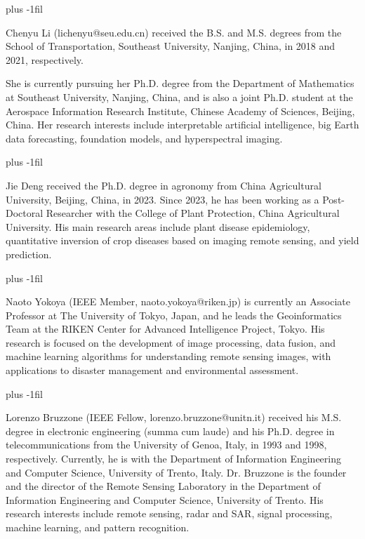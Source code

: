 \documentclass[journal]{IEEEtran}
\begin{document}
\baselineskip plus -1fil

\begin{IEEEbiographynophoto}
    {Chenyu Li} (lichenyu@seu.edu.cn) received the B.S. and M.S. degrees from the School of Transportation, Southeast University, Nanjing, China, in 2018 and 2021, respectively. 

    She is currently pursuing her Ph.D. degree from the Department of Mathematics at Southeast University, Nanjing, China, and is also a joint Ph.D. student at the Aerospace Information Research Institute, Chinese Academy of Sciences, Beijing, China. Her research interests include interpretable artificial intelligence, big Earth data forecasting, foundation models, and hyperspectral imaging.
\end{IEEEbiographynophoto}

\baselineskip plus -1fil

\begin{IEEEbiographynophoto}
    {Jie Deng} received the Ph.D. degree in agronomy from China Agricultural University, Beijing, China, in 2023. Since 2023, he has been working as a Post-Doctoral Researcher with the College of Plant Protection, China Agricultural University. His main research areas include plant disease epidemiology, quantitative inversion of crop diseases based on imaging remote sensing, and yield prediction.
\end{IEEEbiographynophoto}

\baselineskip plus -1fil

\begin{IEEEbiographynophoto}
    {Naoto Yokoya} (IEEE Member, naoto.yokoya@riken.jp) is currently an Associate Professor at The University of Tokyo, Japan, and he leads the Geoinformatics Team at the RIKEN Center for Advanced Intelligence Project, Tokyo. His research is focused on the development of image processing, data fusion, and machine learning algorithms for understanding remote sensing images, with applications to disaster management and environmental assessment.
\end{IEEEbiographynophoto}

\baselineskip plus -1fil

\begin{IEEEbiographynophoto}
    {Lorenzo Bruzzone} (IEEE Fellow, lorenzo.bruzzone@unitn.it) received his M.S. degree in electronic engineering (summa cum laude) and his Ph.D. degree in telecommunications from the University of Genoa, Italy, in 1993 and 1998, respectively. Currently, he is with the Department of Information Engineering and Computer Science, University of Trento, Italy. Dr. Bruzzone is the founder and the director of the Remote Sensing Laboratory in the Department of Information Engineering and Computer Science, University of Trento. His research interests include remote sensing, radar and SAR, signal processing, machine learning, and pattern recognition.
\end{IEEEbiographynophoto}
\end{document}
